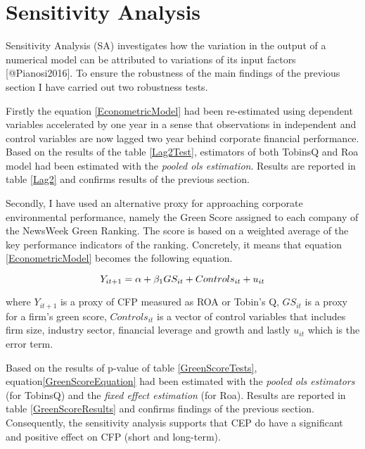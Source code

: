 \documentclass[]{article}
\title{}
\author{}
\date{}
\begin{document}
\section{Sensitivity Analysis}\label{sensitivity-analysis}

Sensitivity Analysis (SA) investigates how the variation in the output
of a numerical model can be attributed to variations of its input
factors {[}@Pianosi2016{]}. To ensure the robustness of the main
findings of the previous section I have carried out two robustness
tests.

Firstly the equation \ref{EconometricModel} had been re-estimated using
dependent variables accelerated by one year in a sense that observations
in independent and control variables are now lagged two year behind
corporate financial performance. Based on the results of the table
\ref{Lag2Test}, estimators of both TobinsQ and Roa model had been
estimated with the \emph{pooled ols estimation}. Results are reported in
table \ref{Lag2} and confirms results of the previous section.

Secondly, I have used an alternative proxy for approaching corporate
environmental performance, namely the Green Score assigned to each
company of the NewsWeek Green Ranking. The score is based on a weighted
average of the key performance indicators of the ranking. Concretely, it
means that equation \ref{EconometricModel} becomes the following
equation.

\begin{equation}
\centering
Y_{it+1} = \alpha + \beta_{1} GS_{it} + Controls_{it} + u_{it}
\label{GreenScoreEquation}
\end{equation}

where \(Y_{it+1}\) is a proxy of CFP measured as ROA or Tobin's Q,
\(GS_{it}\) is a proxy for a firm's green score, \(Controls_{it}\) is a
vector of control variables that includes firm size, industry sector,
financial leverage and growth and lastly \(u_{it}\) which is the error
term.

Based on the results of p-value of table \ref{GreenScoreTests},
equation\ref{GreenScoreEquation} had been estimated with the
\emph{pooled ols estimators} (for TobinsQ) and the \emph{fixed effect
estimation} (for Roa). Results are reported in table
\ref{GreenScoreResults} and confirms findings of the previous section.
Consequently, the sensitivity analysis supports that CEP do have a
significant and positive effect on CFP (short and long-term).
\end{document}
